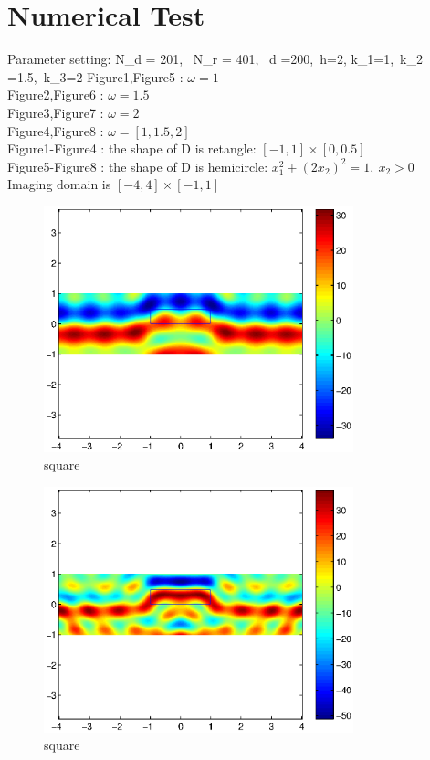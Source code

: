 \documentclass[12pt]{iopart}
\begin{document}
\section{Numerical Test}
Parameter setting:
\ben
N_d = 201, \ N_r = 401, \ d =200,\  h=2, k_1=1\omega,\ k_2 =1.5\omega,\ k_3=2\omega
\een 
Figure1,Figure5 : $\omega=1$\\
Figure2,Figure6 : $\omega=1.5$\\
Figure3,Figure7 : $\omega=2$\\
Figure4,Figure8 : $\omega=[1,1.5,2]$\\
Figure1-Figure4 : the shape of D is retangle: $[-1,1]\times[0,0.5]$ \\
Figure5-Figure8 : the shape of D is hemicircle: $x_1^2+(2x_2)^2=1,\ x_2>0$ \\
Imaging domain is $[-4,4]\times[-1,1]$
\begin{figure}
	\centering
	\includegraphics[width=0.8\textwidth]{./figure_rough/square_1}
	\caption{square}\label{I1}
\end{figure}
\begin{figure}
	\centering
	\includegraphics[width=0.8\textwidth]{./figure_rough/square_1point5}
	\caption{square}\label{I1}
\end{figure}
\end{document}
